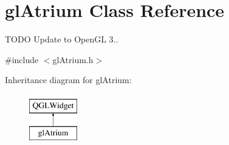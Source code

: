 \hypertarget{classgl_atrium}{\section{gl\+Atrium Class Reference}
\label{classgl_atrium}
}


T\+O\+D\+O Update to Open\+G\+L 3..  




{\ttfamily \#include $<$gl\+Atrium.\+h$>$}

Inheritance diagram for gl\+Atrium\+:\begin{figure}[H]
\begin{center}
\leavevmode
\includegraphics[height=2.000000cm]{classgl_atrium}
\end{center}
\end{figure}
